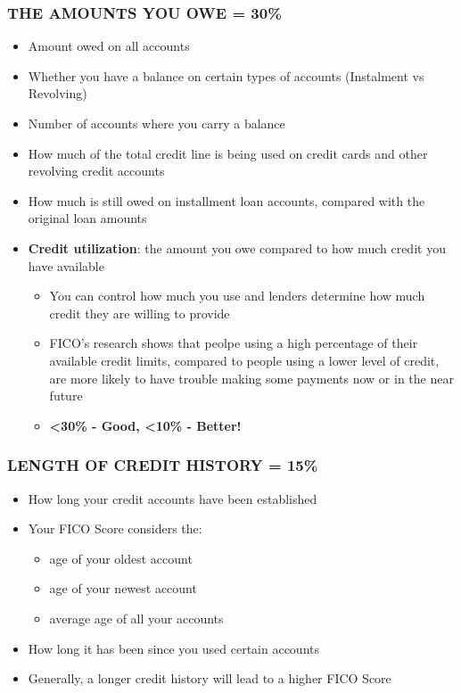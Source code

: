 \documentclass[12pt]{article}
\begin{document}
            \subsubsection{THE AMOUNTS YOU OWE = 30\%}
                \begin{itemize}
                    \item Amount owed on all accounts
                    \item Whether you have a balance on certain types of accounts (Instalment vs Revolving)
                    \item Number of accounts where you carry a balance
                    \item How much of the total credit line is being used on credit cards and other revolving credit accounts
                    \item How much is still owed on installment loan accounts, compared with the original loan amounts
                    \item \textbf{Credit utilization}: the amount you owe compared to how much credit you have available
                        \begin{itemize}
                            \item You can control how much you use and lenders determine how much credit they are willing to provide
                            \item FICO's research shows that peolpe using a high percentage of their available credit limits, compared to people
                                using a lower level of credit, are more likely to have trouble making some payments now or in the near future
                            \item \textbf{<30\% - Good, <10\% - Better!}
                        \end{itemize}
                \end{itemize}
            \subsubsection{LENGTH OF CREDIT HISTORY = 15\%}
                \begin{itemize}
                    \item How long your credit accounts have been established
                    \item Your FICO Score considers the:
                        \begin{itemize}
                            \item age of your oldest account
                            \item age of your newest account
                            \item average age of all your accounts
                        \end{itemize}
                    \item How long it has been since you used certain accounts
                    \item Generally, a longer credit history will lead to a higher FICO Score
                \end{itemize}
\end{document}
